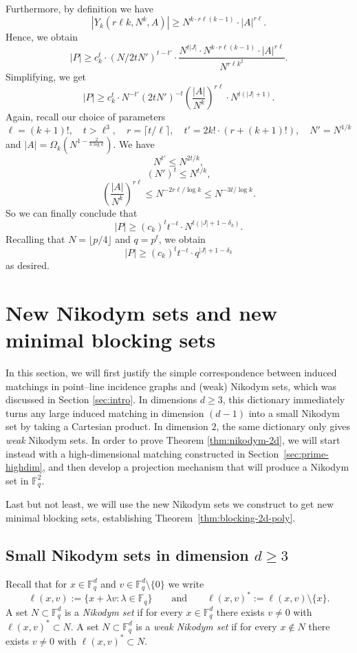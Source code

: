 \documentclass[12pt,reqno]{amsart}
\theoremstyle{plain}
\theoremstyle{definition}
\newcommand{\F}{\mathbb{F}}
\newcommand{\1}{\mathbf{1}}
\newcommand{\abs}[1]{\left|#1\right|}
\begin{document}
Furthermore, by definition we have 
$$\abs{Y_k(r \ell k, N^k, A)} \geq N^{k \cdot r \ell (k - 1)} \cdot \abs{A}^{r \ell}.$$
Hence, we obtain
$$\abs{P} \geq c_k^{t} \cdot (N / 2tN')^{t - t'} \cdot \frac{N^{t\abs{J}}\cdot N^{k \cdot r \ell (k - 1)} \cdot \abs{A}^{r \ell}}{N^{r \ell k^2}}.$$
Simplifying, we get
$$\abs{P} \geq c_k^{t} \cdot N^{-t'} (2tN')^{-t} \left(\frac{|A|}{N^k}\right)^{ r \ell} \cdot N^{t (\abs{J} + 1)}.$$
Again, recall our choice of parameters
$$\ell = (k + 1)!, \quad t > \ell^3, \quad r = \lceil t / \ell \rceil, \quad t' = 2k! \cdot (r + (k + 1)!), \quad N' = N^{1 / k}$$
and $|A| = \Omega_k(N^{1 - \frac{2}{k \log k}})$. We have
$$N^{t'}  \leq N^{2t / k},$$
$$(N')^{t} \leq N^{t / k},$$
$$\left(\frac{|A|}{N^k}\right)^{ r \ell} \leq N^{-2 r\ell / \log k} \leq N^{-3t / \log k}.$$
So we can finally conclude that
$$\abs{P} \geq (c_k)^t t^{-t} \cdot N^{t (|J| + 1 - \delta_k)}.$$
Recalling that $N = \lfloor p / 4 \rfloor$ and $q = p^t$, we obtain
$$\abs{P} \geq (c_k)^t t^{-t} \cdot q^{|J| + 1 - \delta_k}$$
as desired.



\section{New Nikodym sets and new minimal blocking sets}\label{sec:Nikodym-I}

In this section, we will first justify the simple correspondence between induced matchings in point--line incidence graphs and (weak) Nikodym sets, which was discussed in Section \ref{sec:intro}. In dimensions $d\ge 3$, this dictionary immediately turns any large induced matching in dimension $(d - 1)$ into a small Nikodym set by taking a
Cartesian product. In dimension $2$, the same dictionary only gives \emph{weak} Nikodym sets. In order to prove Theorem \ref{thm:nikodym-2d}, we will start instead with a high-dimensional matching constructed in Section~\ref{sec:prime-highdim}, and then develop a projection mechanism that will produce a Nikodym set in $\F_{q}^{2}$. 

Last but not least, we will use the new Nikodym sets we construct to get new minimal blocking sets, establishing Theorem~\ref{thm:blocking-2d-poly}. 

\subsection{Small Nikodym sets in dimension $d\ge 3$}

Recall that for $x\in\F_q^d$ and $v\in\F_q^d\setminus\{0\}$ we write
\[
  \ell(x,v):=\{x+\lambda v:\lambda\in\F_q\}
  \qquad\text{and}\qquad
  \ell(x,v)^\ast:=\ell(x,v)\setminus\{x\}.
\]
A set $N\subset \F_q^d$ is a \emph{Nikodym set} if for every $x\in\F_q^d$ there exists $v\neq 0$ with
$\ell(x,v)^\ast\subset N$.  A set $N\subset \F_q^d$ is a \emph{weak Nikodym set} if for every $x\notin N$ there exists
$v\neq 0$ with $\ell(x,v)^\ast\subset N$.
\end{document}
